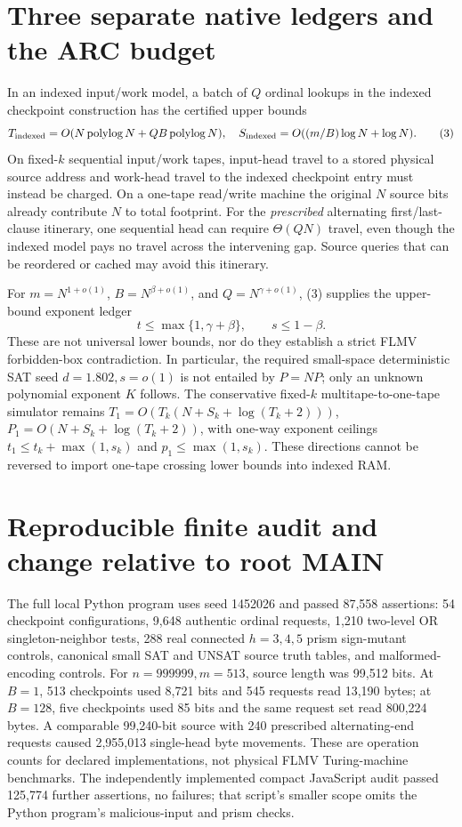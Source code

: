 \documentclass[11pt]{article}
\begin{document}
\section{Three separate native ledgers and the ARC budget}
In an indexed input/work model, a batch of $Q$ ordinal lookups in the indexed checkpoint construction has the certified upper bounds
\[
T_{\rm indexed}=O(N\operatorname{polylog}N+QB\operatorname{polylog}N),\quad
S_{\rm indexed}=O((m/B)\log N+\log N).
\tag{3}
\]
On fixed-$k$ sequential input/work tapes, input-head travel to a stored physical source address and work-head travel to the indexed checkpoint entry must instead be charged. On a one-tape read/write machine the original $N$ source bits already contribute $N$ to total footprint. For the \emph{prescribed} alternating first/last-clause itinerary, one sequential head can require $\Theta(QN)$ travel, even though the indexed model pays no travel across the intervening gap. Source queries that can be reordered or cached may avoid this itinerary.

For $m=N^{1+o(1)}$, $B=N^{\beta+o(1)}$, and $Q=N^{\gamma+o(1)}$, (3) supplies the upper-bound exponent ledger
\[
t\le\max\{1,\gamma+\beta\},\qquad s\le1-\beta.
\tag{4}
\]
These are not universal lower bounds, nor do they establish a strict FLMV forbidden-box contradiction. In particular, the required small-space deterministic SAT seed $d=1.802,s=o(1)$ is not entailed by $P=NP$; only an unknown polynomial exponent $K$ follows. The conservative fixed-$k$ multitape-to-one-tape simulator remains $T_1=O(T_k(N+S_k+\log(T_k+2)))$, $P_1=O(N+S_k+\log(T_k+2))$, with one-way exponent ceilings $t_1\le t_k+\max(1,s_k)$ and $p_1\le\max(1,s_k)$. These directions cannot be reversed to import one-tape crossing lower bounds into indexed RAM.

\section{Reproducible finite audit and change relative to root MAIN}
The full local Python program uses seed 1452026 and passed 87,558 assertions: 54 checkpoint configurations, 9,648 authentic ordinal requests, 1,210 two-level OR singleton-neighbor tests, 288 real connected $h=3,4,5$ prism sign-mutant controls, canonical small SAT and UNSAT source truth tables, and malformed-encoding controls. For $n=999999,m=513$, source length was 99,512 bits. At $B=1$, 513 checkpoints used 8,721 bits and 545 requests read 13,190 bytes; at $B=128$, five checkpoints used 85 bits and the same request set read 800,224 bytes. A comparable 99,240-bit source with 240 prescribed alternating-end requests caused 2,955,013 single-head byte movements. These are operation counts for declared implementations, not physical FLMV Turing-machine benchmarks. The independently implemented compact JavaScript audit passed 125,774 further assertions, no failures; that script's smaller scope omits the Python program's malicious-input and prism checks.
\end{document}
